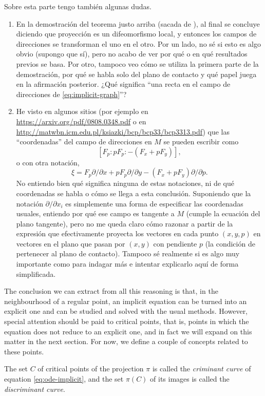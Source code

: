 {\color{red} \noindent Sobre esta parte tengo también algunas dudas.

\begin{enumerate}
  \item En la demostración del teorema justo arriba (sacada de \cite[16-17]{arnold2012geometrical}), al final se concluye diciendo que proyección es un difeomorfismo local, y entonces los campos de direcciones se transforman el uno en el otro. Por un lado, no sé si esto es algo obvio (supongo que sí), pero no acabo de ver por qué o en qué resultados previos se basa. Por otro, tampoco veo cómo se utiliza la primera parte de la demostración, por qué se habla solo del plano de contacto y qué papel juega en la afirmación posterior. ¿Qué significa ``una recta en el campo de direcciones de \eqref{eq:implicit-graph}''?
  \item He visto en algunos sitios (por ejemplo en \url{https://arxiv.org/pdf/0808.0348.pdf} o en \url{http://matwbn.icm.edu.pl/ksiazki/bcp/bcp33/bcp3313.pdf}) que las ``coordenadas'' del campo de direcciones en $M$ se pueden escribir como
  \[
    [F_p:pF_p: -(F_x + pF_y)],
    \]
  o con otra notación,
  \[
  \xi = F_p \partial/\partial x + pF_p \partial/\partial y  - (F_x+pF_y)\partial/\partial p.
  \]
  No entiendo bien qué significa ninguna de estas notaciones, ni de qué coordenadas se habla o cómo se llega a esta conclusión. Suponiendo que la notación $\partial/\partial x_i$ es simplemente una forma de especificar las coordenadas usuales, entiendo por qué ese campo es tangente a $M$ (cumple la ecuación del plano tangente), pero no me queda claro cómo razonar a partir de la expresión que efectivamente proyecta los vectores en cada punto $(x,y,p)$ en vectores en el plano que pasan por $(x,y)$ con pendiente $p$ (la condición de pertenecer al plano de contacto). Tampoco sé realmente si es algo muy importante como para indagar más e intentar explicarlo aquí de forma simplificada.
\end{enumerate}}

The conclusion we can extract from all this reasoning is that, in the neighbourhood of a regular point, an implicit equation can be turned into an explicit one and can be studied and solved with the usual methods. However, special attention should be paid to critical points, that is, points in which the equation does not reduce to an explicit one, and in fact we will expand on this matter in the next section. For now, we define a couple of concepts related to these points.

\begin{definition} The set $C$ of critical points of the projection $\pi$ is called the \textit{criminant curve} of equation \eqref{eq:ode-implicit}, and the set $\pi(C)$ of its images is called the \textit{discriminant curve}.
\end{definition}

